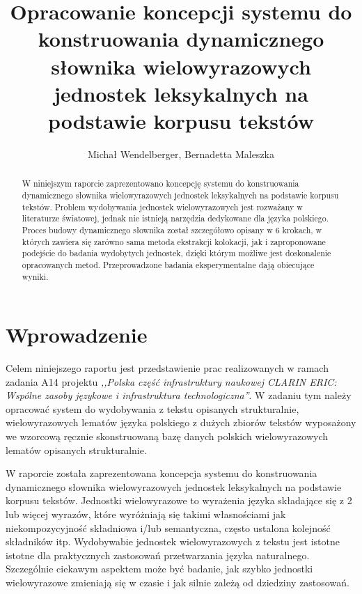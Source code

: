 \documentclass[11pt,a4paper]{llncs}
\begin{document}
\mainmatter  

\title{Opracowanie koncepcji systemu do konstruowania dynamicznego słownika wielowyrazowych jednostek leksykalnych na podstawie korpusu tekstów}

\author{Michał Wendelberger, Bernadetta Maleszka}


\maketitle

\begin{abstract}
W niniejszym raporcie zaprezentowano koncepcję systemu do konstruowania dynamicznego słownika wielowyrazowych jednostek leksykalnych na podstawie korpusu tekstów. Problem wydobywania jednostek wielowyrazowych jest rozważany w literaturze światowej, jednak nie istnieją narzędzia dedykowane dla języka polskiego. Proces budowy dynamicznego słownika został szczegółowo opisany w 6 krokach, w których zawiera się zarówno sama metoda ekstrakcji kolokacji, jak i zaproponowane podejście do badania wydobytych jednostek, dzięki którym możliwe jest doskonalenie opracowanych metod. Przeprowadzone badania eksperymentalne dają obiecujące wyniki.
\end{abstract}


\section{Wprowadzenie}

Celem niniejszego raportu jest przedstawienie prac realizowanych w ramach zadania A14 projektu \emph{,,Polska część infrastruktury naukowej CLARIN ERIC: Wspólne zasoby językowe i infrastruktura technologiczna''}. W zadaniu tym należy opracować system do wydobywania z tekstu opisanych strukturalnie, wielowyrazowych lematów języka polskiego z dużych zbiorów tekstów wyposażony we wzorcową ręcznie skonstruowaną bazę danych polskich wielowyrazowych lematów opisanych strukturalnie.

W raporcie została zaprezentowana koncepcja systemu do konstruowania dynamicznego słownika wielowyrazowych jednostek leksykalnych na podstawie korpusu tekstów. Jednostki wielowyrazowe to wyrażenia języka składające się z 2 lub więcej wyrazów, które wyróżniają się takimi własnościami jak niekompozycyjność składniowa i/lub semantyczna, często ustalona kolejność składników itp. Wydobywabie jednostek wielowyrazowych z tekstu jest istotne istotne dla praktycznych zastosowań przetwarzania języka naturalnego. Szczególnie ciekawym aspektem może być badanie, jak szybko jednostki wielowyrazowe zmieniają się w czasie i jak silnie zależą od dziedziny zastosowań.
\end{document}

